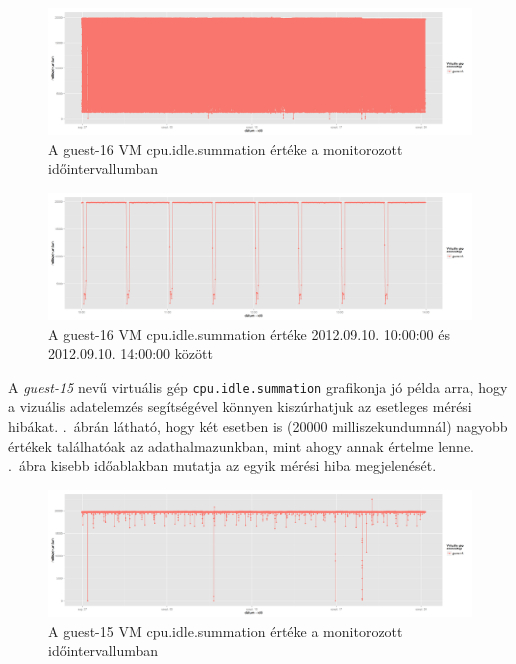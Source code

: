\documentclass[a4paper,10pt,titlepage]{article}
\begin{document}
\begin{figure}[h!]
\centering
\includegraphics[width=1.00\textwidth]{figures/cpu_idle_summation-guest-16-20120826230140-20120924083120.png}
\caption{A guest-16 VM cpu.idle.summation értéke a monitorozott időintervallumban \label{fig:cpu_idle_summation_g16_1}}
\end{figure}

\begin{figure}[h!]
\centering
\includegraphics[width=1.00\textwidth]{figures/cpu_idle_summation-guest-16-20120910100000-20120910140000.png}
\caption{A guest-16 VM cpu.idle.summation értéke 2012.09.10. 10:00:00 és 2012.09.10. 14:00:00 között \label{fig:cpu_idle_summation_g16_2}}
\end{figure}

A \textit{guest-15} nevű virtuális gép \texttt{cpu.idle.summation} grafikonja jó példa arra, hogy a vizuális adatelemzés segítségével könnyen kiszúrhatjuk az esetleges mérési hibákat. .~ábrán látható, hogy két esetben is (20000 milliszekundumnál) nagyobb értékek találhatóak az adathalmazunkban, mint ahogy annak értelme lenne. .~ábra kisebb időablakban mutatja az egyik mérési hiba megjelenését.

\begin{figure}[h!]
\centering
\includegraphics[width=1.00\textwidth]{figures/cpu_idle_summation-guest-15-20120826230140-20120924083120.png}
\caption{A guest-15 VM cpu.idle.summation értéke a monitorozott időintervallumban \label{fig:cpu_idle_summation_g15_1}}
\end{figure}
\end{document}
